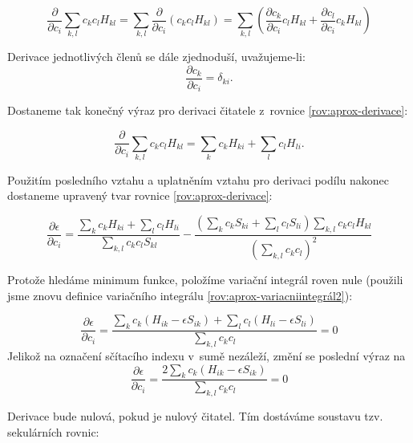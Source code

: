  \begin{equation}
 \frac{\partial}{\partial c_i} \sum_{k,l}c_k c_l H_{kl}=\sum_{k,l} \frac{\partial}{\partial c_i} (c_k c_l H_{kl})=\sum_{k,l} \left(\frac{\partial c_k}{\partial c_i}c_l H_{kl} + \frac{\partial c_l}{\partial c_i}c_k H_{kl} \right)
   \end{equation}
 
\noindent  Derivace jednotlivých členů se dále zjednoduší, uvažujeme-li:
  \begin{equation}
 \frac{\partial c_k}{\partial c_i}=\delta_{ki}.
   \end{equation}
 
 \noindent Dostaneme tak konečný výraz pro derivaci čitatele z~rovnice \ref{rov:aprox-derivace}:
 
  \begin{equation}
 \frac{\partial}{\partial c_i} \sum_{k,l}c_k c_l H_{kl}=\sum_{k} c_k H_{ki}+\sum_{l} c_l H_{li}.
   \end{equation}
 
 \noindent Použitím posledního vztahu a uplatněním vztahu pro derivaci podílu nakonec dostaneme upravený tvar rovnice \ref{rov:aprox-derivace}:
 
  \begin{equation}
 \frac{\partial\epsilon}{\partial c_i}=\frac{\sum_{k} c_k H_{ki}+\sum_{l} c_l H_{li}}{\sum_{k,l}c_kc_lS_{kl}}-\frac{\left(\sum_{k} c_k S_{ki}+\sum_{l} c_l S_{li}\right)\sum_{k,l}c_k c_l H_{kl}}{\left(\sum_{k,l}c_k c_l\right)^2}
   \end{equation}
 
 \noindent Protože hledáme minimum funkce, položíme variační integrál roven nule (použili jsme znovu definice variačního integrálu \ref{rov:aprox-variacniintegrál2}):
 
  \begin{equation}
 \frac{\partial\epsilon}{\partial c_i}=\frac{\sum_k c_{k}\left(H_{ik}-\epsilon S_{ik}\right)+\sum_l c_{l}\left(H_{li}-\epsilon S_{li}\right)}{\sum_{k,l}c_k c_l}=0
     \end{equation}
 Jelikož na označení sčítacího indexu v~sumě nezáleží, změní se poslední výraz na 
\begin{equation} 
 \frac{\partial\epsilon}{\partial c_i}=\frac{2\sum_k c_{k}\left(H_{ik}-\epsilon S_{ik}\right)}{\sum_{k,l}c_k c_l}=0
\end{equation}
 
\noindent Derivace bude nulová, pokud je nulový čitatel. Tím dostáváme soustavu tzv. sekulárních rovnic:

